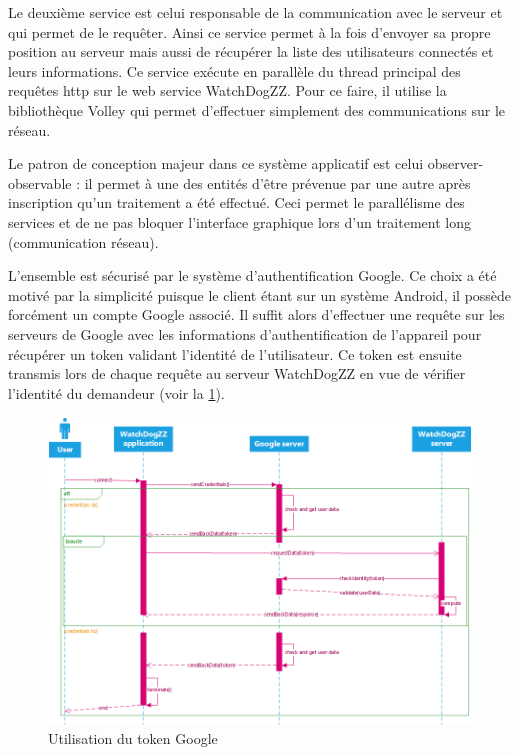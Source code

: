 Le deuxième service est celui responsable de la communication avec le serveur et qui permet de le requêter. Ainsi ce service permet à la fois d’envoyer sa propre position au serveur mais aussi de récupérer la liste des utilisateurs connectés et leurs informations. Ce service exécute en parallèle du thread principal des requêtes http sur le web service WatchDogZZ. Pour ce faire, il utilise la bibliothèque Volley qui permet d’effectuer simplement des communications sur le réseau.

Le patron de conception majeur dans ce système applicatif est celui observer-observable : il permet à une des entités d’être prévenue par une autre après inscription qu’un traitement a été effectué. Ceci permet le parallélisme des services et de ne pas bloquer l’interface graphique lors d’un traitement long (communication réseau).

L’ensemble est sécurisé par le système d’authentification Google. Ce choix a été motivé par la simplicité puisque le client étant sur un système Android, il possède forcément un compte Google associé. Il suffit alors d’effectuer une requête sur les serveurs de Google avec les informations d’authentification de l’appareil pour récupérer un token validant l’identité de l’utilisateur. Ce token est ensuite transmis lors de chaque requête au serveur WatchDogZZ en vue de vérifier l’identité du demandeur (voir la \ref{token}).

\begin{figure}
    \centering
    \includegraphics{./img/android-token.png}
    \caption{Utilisation du token Google}
    \label{token}
\end{figure}

